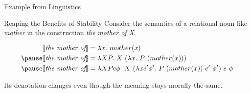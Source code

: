 \documentclass{beamer}
\newcommand{\sem}[1]{\llbracket #1 \rrbracket}
\begin{document}
\begin{frame}{Example from Linguistics}
\end{frame}

\begin{frame}{Reaping the Benefits of Stability}
  Consider the semantics of a relational noun like \textit{mother} in the
  construction \textit{the mother of X}.

  \pause

  \begin{align*}
    \sem{\textit{the mother of}} &= \lambda x.\ mother(x) \\
    \pause
    \sem{\textit{the mother of}} &= \lambda X P.\ X\ (\lambda
    x.\ P\ (mother(x))) \\
    \pause
    \sem{\textit{the mother of}} &= \lambda X P e \phi.\ X\ (\lambda x e'
    \phi'.\ P\ (mother(x))\ e'\ \phi')\ e\ \phi \\
  \end{align*}

  \pause

  Its denotation changes even though the meaning stays morally the same.
\end{frame}
\end{document}

